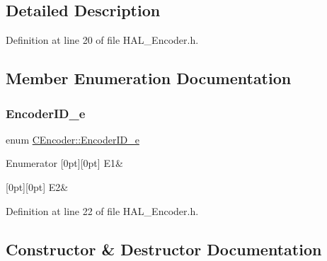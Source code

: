 \subsection{Detailed Description}


Definition at line 20 of file H\+A\+L\+\_\+\+Encoder.\+h.



\subsection{Member Enumeration Documentation}
\mbox{\label{class_c_encoder_a49810cc352199fb02a60e2ef8ac6cbc3}} 
\subsubsection{\texorpdfstring{Encoder\+I\+D\+\_\+e}{EncoderID\_e}}
{\footnotesize\ttfamily enum \mbox{\hyperlink{class_c_encoder_a49810cc352199fb02a60e2ef8ac6cbc3}{C\+Encoder\+::\+Encoder\+I\+D\+\_\+e}}}

\begin{DoxyEnumFields}{Enumerator}
[0pt][0pt]{}\mbox{\label{class_c_encoder_a49810cc352199fb02a60e2ef8ac6cbc3a8f0ceb6874e0c79b53bf26fa42a1b652}} 
E1&\\
\hline

[0pt][0pt]{}\mbox{\label{class_c_encoder_a49810cc352199fb02a60e2ef8ac6cbc3aaa314a69656e242defabd33eb8e90284}} 
E2&\\
\hline

\end{DoxyEnumFields}


Definition at line 22 of file H\+A\+L\+\_\+\+Encoder.\+h.



\subsection{Constructor \& Destructor Documentation}
\mbox{\label{class_c_encoder_ab63d860ef36a6b121ab3007f70743de7}} 
